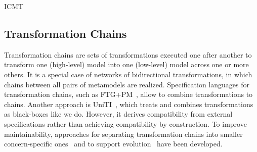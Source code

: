 \begin{copiedFrom}{ICMT}
\subsection*{Transformation Chains}
Transformation chains
are sets of transformations executed one after another to transform one (high-level) model into one (low-level) model across one or more others. %
It is a special case of networks of bidirectional transformations, in which chains between all pairs of metamodels are realized. %
Specification languages for transformation chains, such as FTG+PM~\cite{lucio2013FTGPM-SDL}, allow to combine transformations to chains.
Another approach is UniTI~\cite{vanhooff2006a, vanhooff2007UniTI-MODELS, pilgrim2008a}, 
which treats and combines transformations as black-boxes like we do. 
However, it derives compatibility from external specifications rather than achieving compatibility by construction.
To improve maintainability, approaches for separating transformation chains into smaller concern-specific ones~\cite{yie2012a} and to support evolution~\cite{yie2009a} have been developed.



\end{copiedFrom}
